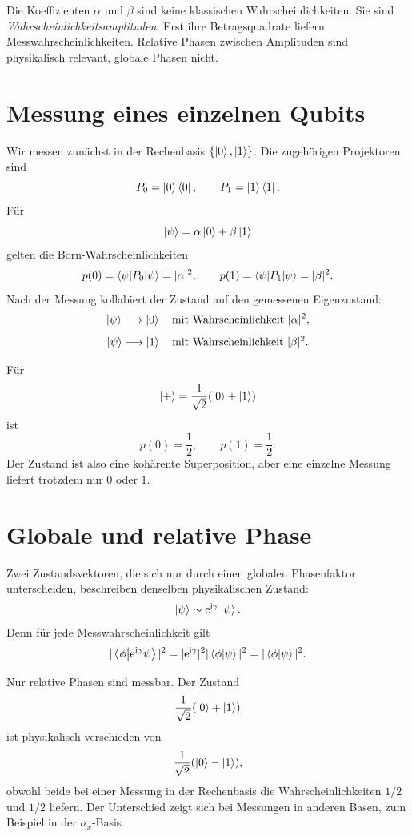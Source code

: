 \begin{warningbox}
Die Koeffizienten \(\alpha\) und \(\beta\) sind keine klassischen Wahrscheinlichkeiten. Sie sind \emph{Wahrscheinlichkeitsamplituden}. Erst ihre Betragsquadrate liefern Messwahrscheinlichkeiten. Relative Phasen zwischen Amplituden sind physikalisch relevant, globale Phasen nicht.
\end{warningbox}

\section{Messung eines einzelnen Qubits}

Wir messen zunächst in der Rechenbasis \(\{\left|0\right\rangle,\left|1\right\rangle\}\). Die zugehörigen Projektoren sind
\[
    P_0=\left|0\right\rangle\left\langle0\right|,
    \qquad
    P_1=\left|1\right\rangle\left\langle1\right|.
\]
Für
\[
    \left|\psi\right\rangle=\alpha\left|0\right\rangle+\beta\left|1\right\rangle
\]
gelten die Born-Wahrscheinlichkeiten
\[
    p(0)=\left\langle\psi\middle|P_0\middle|\psi\right\rangle=|\alpha|^2,
    \qquad
    p(1)=\left\langle\psi\middle|P_1\middle|\psi\right\rangle=|\beta|^2.
\]
Nach der Messung kollabiert der Zustand auf den gemessenen Eigenzustand:
\[
    \left|\psi\right\rangle\longrightarrow \left|0\right\rangle
    \quad\text{mit Wahrscheinlichkeit }|\alpha|^2,
\]
\[
    \left|\psi\right\rangle\longrightarrow \left|1\right\rangle
    \quad\text{mit Wahrscheinlichkeit }|\beta|^2.
\]

\begin{examplebox}
Für
\[
    \left|+\right\rangle=\frac{1}{\sqrt2}(\left|0\right\rangle+\left|1\right\rangle)
\]
ist
\[
    p(0)=\frac12,
    \qquad
    p(1)=\frac12.
\]
Der Zustand ist also eine kohärente Superposition, aber eine einzelne Messung liefert trotzdem nur \(0\) oder \(1\).
\end{examplebox}

\section{Globale und relative Phase}

Zwei Zustandsvektoren, die sich nur durch einen globalen Phasenfaktor unterscheiden, beschreiben denselben physikalischen Zustand:
\[
    \left|\psi\right\rangle\sim \mathrm{e}^{\mathrm{i}\gamma}\left|\psi\right\rangle.
\]
Denn für jede Messwahrscheinlichkeit gilt
\[
    |\left\langle\phi\middle|\mathrm{e}^{\mathrm{i}\gamma}\psi\right\rangle|^2
    =|\mathrm{e}^{\mathrm{i}\gamma}|^2 |\left\langle\phi\middle|\psi\right\rangle|^2
    =|\left\langle\phi\middle|\psi\right\rangle|^2.
\]

\begin{conceptbox}
Nur relative Phasen sind messbar. Der Zustand
\[
    \frac{1}{\sqrt2}(\left|0\right\rangle+\left|1\right\rangle)
\]
ist physikalisch verschieden von
\[
    \frac{1}{\sqrt2}(\left|0\right\rangle-\left|1\right\rangle),
\]
obwohl beide bei einer Messung in der Rechenbasis die Wahrscheinlichkeiten \(1/2\) und \(1/2\) liefern. Der Unterschied zeigt sich bei Messungen in anderen Basen, zum Beispiel in der \(\sigma_x\)-Basis.
\end{conceptbox}

